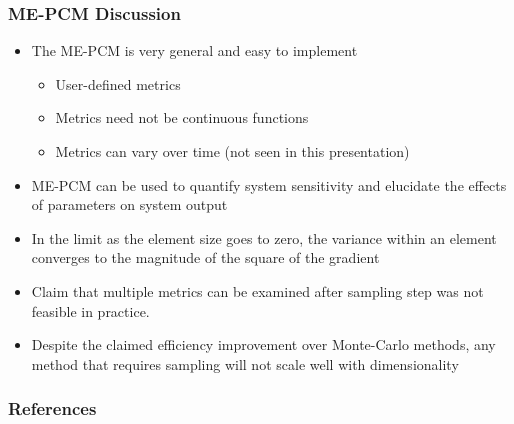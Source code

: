 \documentclass{beamer}
\theoremstyle{plain}
\theoremstyle{definition}
\begin{document}
\begin{frame}\frametitle{ME-PCM Discussion}
 \begin{itemize}
   \item The ME-PCM is very general and easy to implement
   \begin{itemize}
     \item User-defined metrics
     \item Metrics need not be continuous functions
     \item Metrics can vary over time (not seen in this presentation)
   \end{itemize}
   \item ME-PCM can be used to quantify system sensitivity and elucidate the effects of parameters on system output
   \item In the limit as the element size goes to zero, the variance within an element converges to the magnitude of the square of the gradient
   \item Claim that multiple metrics can be examined after sampling step was not feasible in practice.
   \item Despite the claimed efficiency improvement over Monte-Carlo methods, any method that requires sampling will not scale well with dimensionality
 \end{itemize}
\end{frame}

\begin{frame}\frametitle{References}
  \printbibliography
\end{frame}
\end{document}
